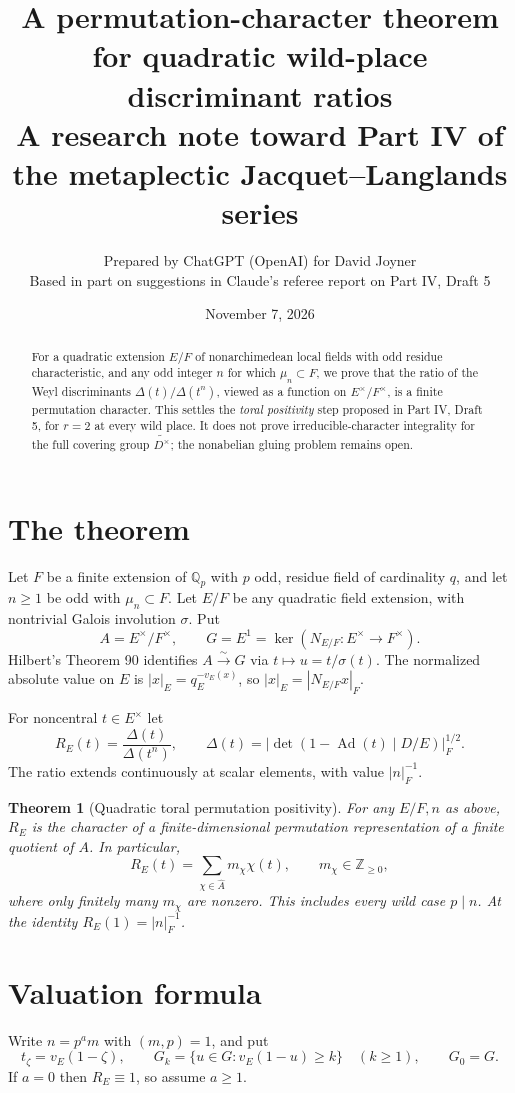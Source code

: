 \documentclass[11pt]{article}
\title{A permutation-character theorem for quadratic wild-place discriminant ratios\\\large A research note toward Part IV of the metaplectic Jacquet--Langlands series}
\author{Prepared by ChatGPT (OpenAI) for David Joyner\\\small Based in part on suggestions in Claude's referee report on Part IV, Draft 5}
\date{November 7, 2026}
\newtheorem{theorem}{Theorem}
\newcommand{\Z}{\mathbb Z}
\newcommand{\1}{\mathbf 1}
\begin{document}
\maketitle
\begin{abstract}
For a quadratic extension $E/F$ of nonarchimedean local fields with odd residue characteristic, and any odd integer $n$ for which $\mu_n\subset F$, we prove that the ratio of the Weyl discriminants $\Delta(t)/\Delta(t^n)$, viewed as a function on $E^\times/F^\times$, is a finite permutation character. This settles the \emph{toral positivity} step proposed in Part IV, Draft 5, for $r=2$ at every wild place. It does not prove irreducible-character integrality for the full covering group $\widetilde{D^\times}$; the nonabelian gluing problem remains open.
\end{abstract}

\section{The theorem}
Let $F$ be a finite extension of $\mathbb Q_p$ with $p$ odd, residue field of cardinality $q$, and let $n\geq1$ be odd with $\mu_n\subset F$. Let $E/F$ be any quadratic field extension, with nontrivial Galois involution $\sigma$. Put
\[
 A=E^\times/F^\times,\qquad G=E^1=\ker(N_{E/F}:E^\times\to F^\times).
\]
Hilbert's Theorem 90 identifies $A\xrightarrow{\sim}G$ via $t\mapsto u=t/\sigma(t)$. The normalized absolute value on $E$ is $|x|_E=q_E^{-v_E(x)}$, so $|x|_E=|N_{E/F}x|_F$.

For noncentral $t\in E^\times$ let
\[
 R_E(t)=\frac{\Delta(t)}{\Delta(t^n)},\qquad
 \Delta(t)=\bigl|\det(1-\operatorname{Ad}(t)\mid D/E)\bigr|_F^{1/2}.
\]
The ratio extends continuously at scalar elements, with value $|n|_F^{-1}$.

\begin{theorem}[Quadratic toral permutation positivity]\label{thm:main}
For any $E/F,n$ as above, $R_E$ is the character of a finite-dimensional permutation representation of a finite quotient of $A$. In particular,
\[
 R_E(t)=\sum_{\chi\in\widehat A}m_\chi\chi(t),\qquad m_\chi\in\Z_{\geq0},
\]
where only finitely many $m_\chi$ are nonzero. This includes every wild case $p\mid n$. At the identity $R_E(1)=|n|_F^{-1}$.
\end{theorem}

\section{Valuation formula}
Write $n=p^a m$ with $(m,p)=1$, and put
\[
 t_\zeta=v_E(1-\zeta),\qquad
 G_k=\{u\in G:v_E(1-u)\geq k\}\quad(k\geq1),\qquad G_0=G.
\]
If $a=0$ then $R_E\equiv1$, so assume $a\geq1$.
\end{document}
